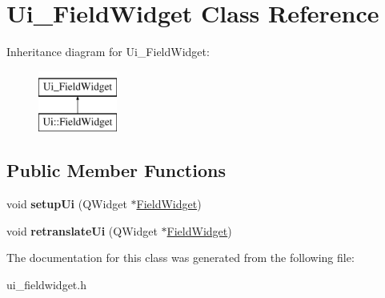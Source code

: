 \hypertarget{class_ui___field_widget}{}\section{Ui\+\_\+\+Field\+Widget Class Reference}
\label{class_ui___field_widget}
Inheritance diagram for Ui\+\_\+\+Field\+Widget\+:\begin{figure}[H]
\begin{center}
\leavevmode
\includegraphics[height=2.000000cm]{class_ui___field_widget}
\end{center}
\end{figure}
\subsection*{Public Member Functions}
\begin{DoxyCompactItemize}
\item 
\mbox{\label{class_ui___field_widget_abadaef52ee8016abce85f45454b2fa8e}} 
void {\bfseries setup\+Ui} (Q\+Widget $\ast$\hyperlink{class_field_widget}{Field\+Widget})
\item 
\mbox{\label{class_ui___field_widget_ad0cb82ccef5035b6e5f2ccb21db96be7}} 
void {\bfseries retranslate\+Ui} (Q\+Widget $\ast$\hyperlink{class_field_widget}{Field\+Widget})
\end{DoxyCompactItemize}


The documentation for this class was generated from the following file\+:\begin{DoxyCompactItemize}
\item 
ui\+\_\+fieldwidget.\+h\end{DoxyCompactItemize}
